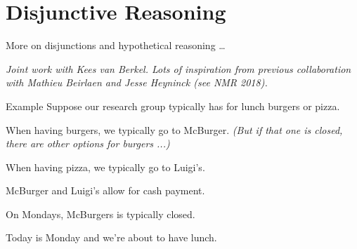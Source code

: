 \documentclass[aspectratio=169]{beamer}
\begin{document}
\section{Disjunctive Reasoning}
\label{sec:orgd76d5a1}

\begin{frame}[label={sec:orgb710fd7},standout]{}
More on disjunctions and hypothetical reasoning \ldots{}

\vspace{2cm}

\emph{Joint work with \alert{Kees van Berkel}. Lots of inspiration from previous collaboration with \alert{Mathieu Beirlaen} and \alert{Jesse Heyninck} (see NMR 2018).}
\end{frame}

\begin{frame}{Example}
    Suppose our research group typically has for lunch burgers or pizza.  \pause

    When having burgers, we typically go to McBurger. {\it (But if that one is closed, there are other options for burgers ...)} \pause

    When having pizza, we typically go to Luigi's. \pause

    McBurger and Luigi's allow for cash payment. \pause

    On Mondays, McBurgers is typically closed. \pause 

    Today is Monday and we're about to have lunch.
\end{frame}
\end{document}
